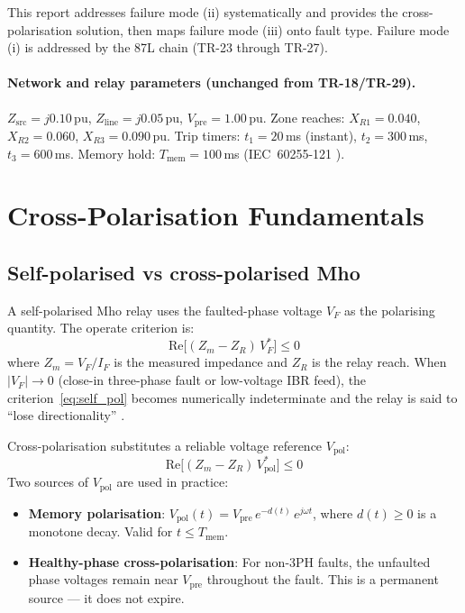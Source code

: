 \documentclass[11pt,a4paper]{article}
\begin{document}
This report addresses failure mode (ii) systematically and provides the
cross-polarisation solution, then maps failure mode (iii) onto fault type.
Failure mode (i) is addressed by the 87L chain (TR-23 through TR-27).

\paragraph{Network and relay parameters (unchanged from TR-18/TR-29).}
$Z_\mathrm{src}=j0.10$\,pu, $Z_\mathrm{line}=j0.05$\,pu, $V_\mathrm{pre}=1.00$\,pu.
Zone reaches: $X_{R1}=0.040$, $X_{R2}=0.060$, $X_{R3}=0.090$\,pu.
Trip timers: $t_1=20$\,ms (instant), $t_2=300$\,ms, $t_3=600$\,ms.
Memory hold: $T_\mathrm{mem}=100$\,ms (IEC~60255-121 \cite{IEC_60255_121}).

\section{Cross-Polarisation Fundamentals}
\label{sec:theory}

\subsection{Self-polarised vs cross-polarised Mho}

A self-polarised Mho relay uses the faulted-phase voltage $V_F$ as the
polarising quantity.  The operate criterion is:
\begin{equation}
  \mathrm{Re}\bigl[(Z_m - Z_R)\,V_F^*\bigr] \leq 0
  \label{eq:self_pol}
\end{equation}
where $Z_m = V_F / I_F$ is the measured impedance and $Z_R$ is the relay reach.
When $|V_F|\to 0$ (close-in three-phase fault or low-voltage IBR feed), the
criterion~\eqref{eq:self_pol} becomes numerically indeterminate and the relay is
said to ``lose directionality'' \cite{Ziegler2006}.

Cross-polarisation substitutes a reliable voltage reference $V_\mathrm{pol}$:
\begin{equation}
  \mathrm{Re}\bigl[(Z_m - Z_R)\,V_\mathrm{pol}^*\bigr] \leq 0
  \label{eq:cross_pol}
\end{equation}
Two sources of $V_\mathrm{pol}$ are used in practice:
\begin{itemize}
  \item \textbf{Memory polarisation}: $V_\mathrm{pol}(t) = V_\mathrm{pre}\,
        e^{-d(t)}\,e^{j\omega t}$, where $d(t)\geq 0$ is a monotone decay.
        Valid for $t \leq T_\mathrm{mem}$.
  \item \textbf{Healthy-phase cross-polarisation}: For non-3PH faults, the
        unfaulted phase voltages remain near $V_\mathrm{pre}$ throughout the fault.
        This is a permanent source --- it does not expire.
\end{itemize}
\end{document}
